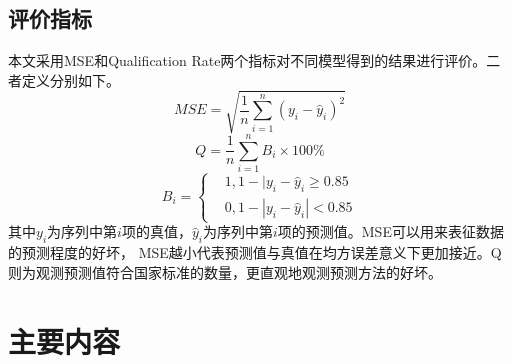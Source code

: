 \documentclass{ctexart}
\begin{document}
\subsection{评价指标}
本文采用MSE和Qualification Rate两个指标对不同模型得到的结果进行评价。二者定义分别如下。\\
\begin{equation}
    MSE = \sqrt{\frac{1}{n}\sum_{i=1}^n (y_i-\hat{y}_i)^2}
\end{equation}
\begin{equation}
    Q = \frac{1}{n}\sum_{i=1}^n B_i\times 100\%
\end{equation}
\begin{equation}
    B_i = \left\{
        \begin{aligned}
            &1, 1-|y_i-\hat{y}_i \geq 0.85\\
            &0, 1-|y_i-\hat{y}_i| < 0.85
        \end{aligned}
        \right .
\end{equation}
其中$y_i$为序列中第$i$项的真值，$\hat{y}_i$为序列中第$i$项的预测值。MSE可以用来表征数据的预测程度的好坏，
MSE越小代表预测值与真值在均方误差意义下更加接近。Q则为观测预测值符合国家标准的数量，更直观地观测预测方法的好坏。

\section{主要内容}
\end{document}
